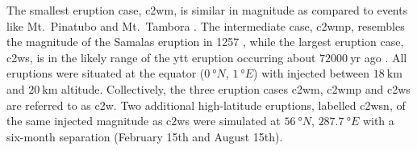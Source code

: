 \documentclass{ametsocV6.1}
\newcommand{\iso}[1][i]{{#1}njected \ce{SO2}}
\begin{document}
The smallest eruption case, \gls{c2wm}, is similar in magnitude as compared to events
like Mt.\ Pinatubo
\citep[\(\sim10\)--\(\SI{20}{\tera\gram(\ce{SO2})}\);][]{timmreck2018} and Mt.\ Tambora
\citep[\(\sim\SI{56.2}{\tera\gram(\ce{SO2})}\);][]{zanchettin2016}. The intermediate
case, \gls{c2wmp}, resembles the magnitude of the Samalas eruption in 1257
\citep[\(\sim{144}\)--\(\SI{170}{\tera\gram(\ce{SO2})}\);][]{vidal2016}, while the
largest eruption case, \gls{c2ws}, is in the likely range of the \gls{ytt} eruption
occurring about \(\SI{72000}{\mathrm{yr}}\) ago
\citep[\(100\)--\(\SI{10000}{\tera\gram(\ce{SO2})}\);][]{jones2005}. All eruptions were
situated at the equator (\(\SI{0}{\degree N}\), \(\SI{1}{\degree E}\)) with 
injected between \(\SI{18}{\kilo\meter}\) and \(\SI{20}{\kilo\meter}\) altitude.
Collectively, the three eruption cases \gls{c2wm}, \gls{c2wmp} and \gls{c2ws} are
referred to as \gls{c2w}. Two additional high-latitude eruptions, labelled \gls{c2wsn},
of the same \iso{} magnitude as \gls{c2ws} were simulated at \(\SI{56}{\degree N}\),
\(\SI{287.7}{\degree E}\) with a six-month separation (February 15th and August 15th).
\end{document}
